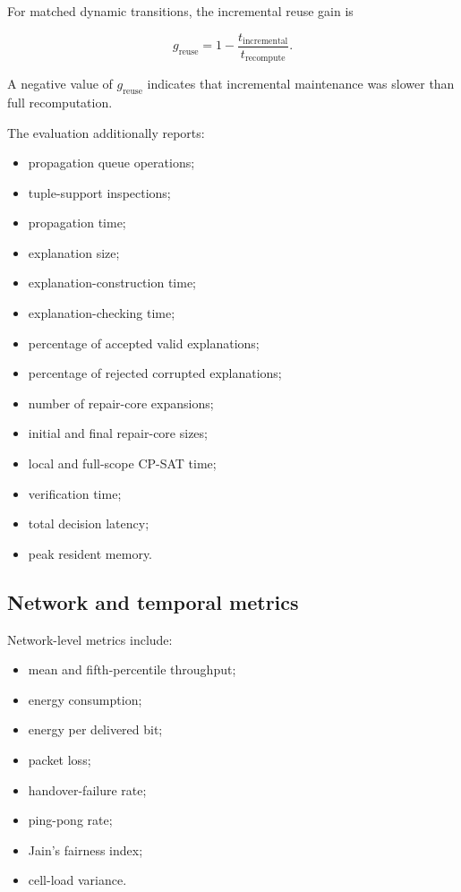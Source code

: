\documentclass[pdflatex,sn-mathphys-num,iicol,oneside]{sn-jnl}
\begin{document}
For matched dynamic transitions, the incremental reuse gain is

\begin{equation}
g_{\mathrm{reuse}}
=
1-
\frac{
t_{\mathrm{incremental}}
}{
t_{\mathrm{recompute}}
}.
\label{eq:reuse-gain}
\end{equation}

A negative value of $g_{\mathrm{reuse}}$ indicates that incremental
maintenance was slower than full recomputation.

The evaluation additionally reports:

\begin{itemize}
    \item propagation queue operations;
    \item tuple-support inspections;
    \item propagation time;
    \item explanation size;
    \item explanation-construction time;
    \item explanation-checking time;
    \item percentage of accepted valid explanations;
    \item percentage of rejected corrupted explanations;
    \item number of repair-core expansions;
    \item initial and final repair-core sizes;
    \item local and full-scope CP-SAT time;
    \item verification time;
    \item total decision latency;
    \item peak resident memory.
\end{itemize}

\subsection{Network and temporal metrics}

Network-level metrics include:

\begin{itemize}
    \item mean and fifth-percentile throughput;
    \item energy consumption;
    \item energy per delivered bit;
    \item packet loss;
    \item handover-failure rate;
    \item ping-pong rate;
    \item Jain's fairness index;
    \item cell-load variance.
\end{itemize}
\end{document}
